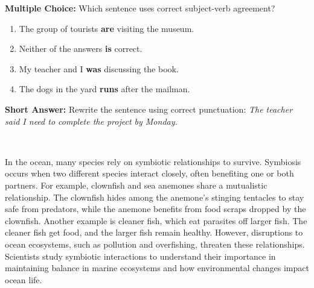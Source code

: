 \documentclass[12pt]{article}
\begin{document}
\begin{tcolorbox}[colframe=black!50, colback=white, title=Question 8]
\textbf{Multiple Choice:} Which sentence uses correct subject-verb agreement?  
\begin{enumerate}[label=(\Alph*)]
\item The group of tourists \textbf{are} visiting the museum.  
\item Neither of the answers \textbf{is} correct.  
\item My teacher and I \textbf{was} discussing the book.  
\item The dogs in the yard \textbf{runs} after the mailman.  
\end{enumerate}
\end{tcolorbox}

\begin{tcolorbox}[colframe=black!50, colback=white, title=Question 9]
\textbf{Short Answer:} Rewrite the sentence using correct punctuation:  
\textit{The teacher said I need to complete the project by Monday.}  

\vspace{2em}
\\[0.8cm] \underline{\hspace{15.8cm}}  
\end{tcolorbox}

\begin{tcolorbox}[colframe=black!50, colback=white, title=Passage: Symbiotic Ocean Relationships]
In the ocean, many species rely on symbiotic relationships to survive. Symbiosis occurs when two different species interact closely, often benefiting one or both partners. For example, clownfish and sea anemones share a mutualistic relationship. The clownfish hides among the anemone’s stinging tentacles to stay safe from predators, while the anemone benefits from food scraps dropped by the clownfish. Another example is cleaner fish, which eat parasites off larger fish. The cleaner fish get food, and the larger fish remain healthy. However, disruptions to ocean ecosystems, such as pollution and overfishing, threaten these relationships. Scientists study symbiotic interactions to understand their importance in maintaining balance in marine ecosystems and how environmental changes impact ocean life.
\end{tcolorbox}
\end{document}
